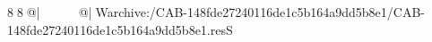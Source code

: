 8  8  @|                                                   @| W   archive:/CAB-148fde27240116de1c5b164a9dd5b8e1/CAB-148fde27240116de1c5b164a9dd5b8e1.resS 